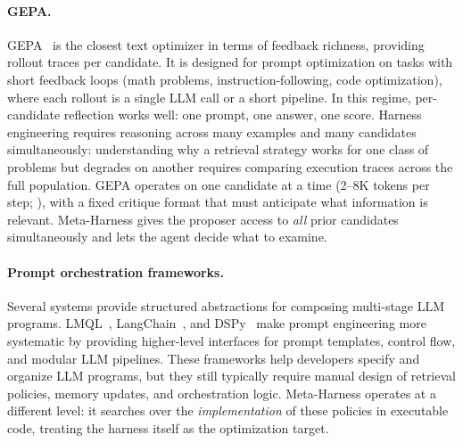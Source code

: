 \paragraph{GEPA.}
GEPA~\citep{agrawal2025gepa} is the closest text optimizer in terms of feedback richness, providing rollout traces per candidate.
It is designed for prompt optimization on tasks with short feedback loops (math problems, instruction-following, code optimization), where each rollout is a single LLM call or a short pipeline.
In this regime, per-candidate reflection works well: one prompt, one answer, one score.
Harness engineering requires reasoning across many examples and many candidates simultaneously: understanding why a retrieval strategy works for one class of problems but degrades on another requires comparing execution traces across the full population.
GEPA operates on one candidate at a time (2--8K tokens per step; ), with a fixed critique format that must anticipate what information is relevant.
Meta-Harness gives the proposer access to \textit{all} prior candidates simultaneously and lets the agent decide what to examine.

\paragraph{Prompt orchestration frameworks.}
Several systems provide structured abstractions for composing multi-stage LLM programs. LMQL~\citep{Beurer_Kellner_2023}, LangChain~\citep{chase2022langchain}, and DSPy~\citep{khattab2023dspycompilingdeclarativelanguage} make prompt engineering more systematic by providing higher-level interfaces for prompt templates, control flow, and modular LLM pipelines. These frameworks help developers specify and organize LLM programs, but they still typically require manual design of retrieval policies, memory updates, and orchestration logic. Meta-Harness operates at a different level: it searches over the \emph{implementation} of these policies in executable code, treating the harness itself as the optimization target.

